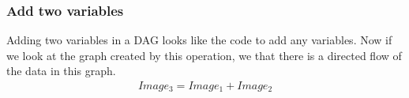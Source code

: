 \documentclass[letterpaper,10pt,english]{sphinxmanual}
\begin{document}
\begin{sphinxVerbatim}[commandchars=\\\{\}]
   

   
     
     
\end{sphinxVerbatim}

\noindent{}


\subsubsection{Add two variables}
\label{\detokenize{01-Introduction:add-two-variables}}
\sphinxAtStartPar
Adding two variables in a DAG looks like the code to add any variables. Now if we look at the graph created by this operation, we that there is a directed flow of the data in this graph.
\begin{equation*}
\begin{split}Image_3 = Image_1 + Image_2\end{split}
\end{equation*}
\begin{sphinxVerbatim}[commandchars=\\\{\}]
    
\end{sphinxVerbatim}

\noindent{}
\end{document}
